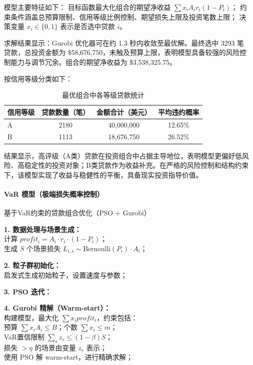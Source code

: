 \documentclass{write_paper}
\begin{document}
模型主要特征如下：
目标函数最大化组合的期望净收益 $\sum x_i A_i r_i (1 - P_i)$；
约束条件涵盖总预算限制、信用等级比例控制、期望损失上限及投资笔数上限；
决策变量 $x_i \in \{0,1\}$ 表示是否选中贷款 $i$。

求解结果显示：Gurobi 优化器可在约 1.3 秒内收敛至最优解。最终选中 3293 笔贷款，总投资金额为 \$58,676,750，未触及预算上限，表明模型具备较强的风险控制能力与调节冗余。组合的期望净收益为 \$3,538,325.75。

按信用等级分类如下：

\begin{table}[htbp]
\centering
\caption{最优组合中各等级贷款统计}
\begin{tabular}{lccc}
\toprule
信用等级 & 贷款数量（笔） & 金额合计（美元） & 平均违约概率 \\
\midrule
A & 2180 & 40,000,000 & 12.65\% \\
B & 1113 & 18,676,750 & 26.52\% \\
\bottomrule
\end{tabular}
\end{table}

结果显示，高评级（A类）贷款在投资组合中占据主导地位，表明模型更偏好低风险、高稳定性的投资对象；B类贷款作为收益补充。在严格的风险控制和结构约束下，该模型实现了收益与稳健性的平衡，具备现实投资指导价值。

\vspace{1em}
\paragraph{VaR 模型（极端损失概率控制）}

\begin{algorithm}[htbp]
\caption{基于VaR约束的贷款组合优化（PSO + Gurobi）}

\textbf{1. 数据处理与场景生成：} \\
计算 $profit_i = A_i \cdot r_i \cdot (1 - P_i)$；\\
生成 $S$ 个场景损失 $L_{i,s} \sim \text{Bernoulli}(P_i) \cdot A_i$；

\textbf{2. 粒子群初始化：} \\
启发式生成初始粒子，设置速度与参数；

\textbf{3. PSO 迭代：} \\

\textbf{4. Gurobi 精解（Warm-start）：} \\
构建模型，最大化 $\sum x_i profit_i$，约束包括：\\
预算 $\sum x_i A_i \le B$；个数 $\sum x_i \le m$；\\
VaR置信限制 $\sum_s z_s \le (1 - \beta) S$；\\
损失 $> \eta$ 的场景由变量 $z_s$ 表示；\\
使用 PSO 解 warm-start，进行精确求解；
\end{algorithm}
\end{document}
